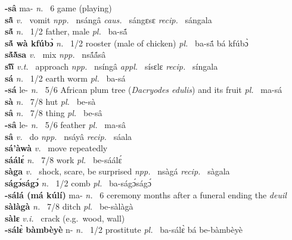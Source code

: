 \noindent 
{\bfseries -sâ} ma- {\itshape n.~} 6 game (playing)    \\ 
{\bfseries sã̂}  {\itshape v.~} vomit   {\itshape npp.~} nsángâ {\itshape caus.~} sángɛsɛ {\itshape recip.~} sángala  \\ 
{\bfseries sã́} {\itshape n.~} 1/2 father, male {\itshape pl.~} ba-sã́    \\
{\bfseries sã́ wà kfúbɔ̀}  {\itshape n.~} 1/2 rooster (male of chicken) {\itshape pl.~} ba-sã́ bá kfúbɔ̀    \\ 
{\bfseries sã́ã̀sa}  {\itshape v.~} mix   {\itshape npp.~} nsã́ã́sâ  \\ 
{\bfseries sĩ́ĩ̀}  {\itshape v.t.~} approach   {\itshape npp.~} nsíngâ {\itshape appl.~} sísɛlɛ {\itshape recip.~} síngala  \\ 
{\bfseries sá}   {\itshape n.~} 1/2 earth worm {\itshape pl.~} ba-sá    \\ 
{\bfseries -sá} le- {\itshape n.~} 5/6 African plum tree  ({\itshape Dacryodes edulis}) and its fruit {\itshape pl.~} ma-sá    \\ 
{\bfseries sà}  {\itshape n.~} 7/8 hut {\itshape pl.~} be-sà    \\ 
{\bfseries sâ}  {\itshape n.~} 7/8 thing {\itshape pl.~} be-sâ    \\ 
{\bfseries -sâ} le- {\itshape n.~} 5/6 feather {\itshape pl.~} ma-sâ    \\ 
{\bfseries sâ}  {\itshape v.~} do   {\itshape npp.~} nsáyâ {\itshape recip.~} sáala  \\ 
{\bfseries sá'àwà}  {\itshape v.~} move repeatedly    \\ 
{\bfseries sáálɛ́}  {\itshape n.~} 7/8 work {\itshape pl.~} be-sáálɛ́    \\ 
{\bfseries sàga}  {\itshape v.~} shock, scare, be surprised   {\itshape npp.~} nsàgá {\itshape recip.~} sàgala  \\ 
{\bfseries ságɔ́ságɔ́}  {\itshape n.~} 1/2 comb {\itshape pl.~} ba-ságɔ́ságɔ́    \\ 
{\bfseries -sálá (má kúlí)} ma- {\itshape n.~} 6 ceremony months after a funeral ending the {\itshape deuil}    \\ 
{\bfseries sàlàgà}  {\itshape n.~} 7/8 ditch {\itshape pl.~} be-sàlàgà    \\ 
{\bfseries sàlɛ}  {\itshape v.i.~} crack (e.g.\ wood, wall)    \\ 
{\bfseries -sálɛ̀ bàmbèyè} n- {\itshape n.~} 1/2 prostitute {\itshape pl.~} ba-sálɛ̀ bá be-bàmbèyè    \\ 
